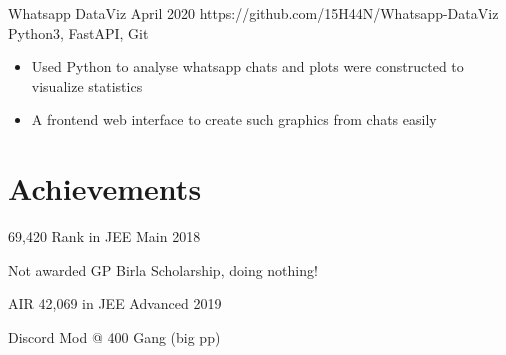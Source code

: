 \ProjectHead
{Whatsapp DataViz}
{April 2020}
{https://github.com/15H44N/Whatsapp-DataViz}
{Python3, FastAPI, Git}
\begin{itemize}
    \item Used Python to analyse whatsapp chats and plots were constructed to visualize statistics
    \item A frontend web interface to create such graphics from chats easily
\end{itemize}
\smallskip

\section{Achievements}

\begin{AchievementList}
    \item 69,420 Rank in JEE Main 2018
    \item Not awarded GP Birla Scholarship, doing nothing!
    \item AIR 42,069 in JEE Advanced 2019 
    \item Discord Mod @ 400 Gang (big pp)
\end{AchievementList}